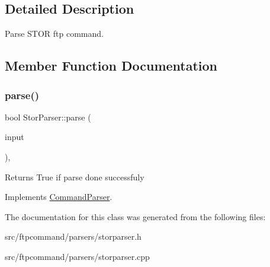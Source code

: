 \subsection{Detailed Description}
Parse S\+T\+OR ftp command. 

\subsection{Member Function Documentation}
\mbox{\label{classStorParser_a3b268c187eaf7135971fb553e9d10cf3}} 
\subsubsection{\texorpdfstring{parse()}{parse()}}
{\footnotesize\ttfamily bool Stor\+Parser\+::parse (\begin{DoxyParamCaption}\item[{const Q\+String \&}]{input }\end{DoxyParamCaption})\hspace{0.3cm}{\ttfamily [override]}, {\ttfamily [virtual]}}

\begin{DoxyReturn}{Returns}
True if parse done successfuly 
\end{DoxyReturn}


Implements \hyperlink{classCommandParser_a5ed0855947a9b4500329f29b8123f2ea}{Command\+Parser}.



The documentation for this class was generated from the following files\+:\begin{DoxyCompactItemize}
\item 
src/ftpcommand/parsers/storparser.\+h\item 
src/ftpcommand/parsers/storparser.\+cpp\end{DoxyCompactItemize}
